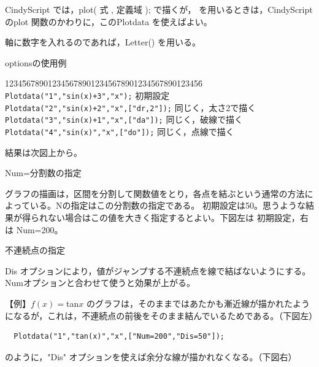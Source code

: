 \documentclass[papersize,a4paper,12pt,uplatex]{jsarticle}
\begin{document}
\begin{description}
  CindyScript では，plot( 式 , 定義域 ); で描くが， \ketcindy  を用いるときは，CindyScript のplot 関数のかわりに，このPlotdata を使えばよい。
  
軸に数字を入れるのであれば，Letter() を用いる。

\vspace{\baselineskip}
optionsの使用例
\begin{tabbing}
1234\=567890123456789012345678901234567890123456\=\kill
 \> \verb|Plotdata("1","sin(x)+3","x");| \> 初期設定\\
 \> \verb|Plotdata("2","sin(x)+2","x",["dr,2"]);| \> 同じく，太さ2で描く\\
 \> \verb|Plotdata("3","sin(x)+1","x",["da"]);|  \> 同じく，破線で描く\\
 \> \verb|Plotdata("4","sin(x)","x",["do"]);|  \> 同じく，点線で描く
 \end{tabbing}
結果は次図上から。

\vspace{\baselineskip}
\hspace{20mm} \scalebox{0.9}{} 

Num=分割数の指定

グラフの描画は，区間を分割して関数値をとり，各点を結ぶという通常の方法によっている。Nの指定はこの分割数の指定である。 初期設定は50。思うような結果が得られない場合はこの値を大きく指定するとよい。下図左は 初期設定，右は Num=200。

\vspace{\baselineskip}
\hspace{20mm}\scalebox{0.8}{ }

不連続点の指定
  
Dis オプションにより，値がジャンプする不連続点を線で結ばないようにする。Numオプションと合わせて使うと効果が上がる。

\vspace{\baselineskip}
  【例】$f(x)=$tan$x$ のグラフは，そのままではあたかも漸近線が描かれたようになるが，これは，不連続点の前後をそのまま結んでいるためである。（下図左）
\begin{verbatim}
  Plotdata("1","tan(x)","x",["Num=200","Dis=50"]);
\end{verbatim}
のように，"Dis" オプションを使えば余分な線が描かれなくなる。（下図右）

\vspace{\baselineskip}
\hspace{20mm} \hspace{20mm}  


\end{description}
\end{document}
